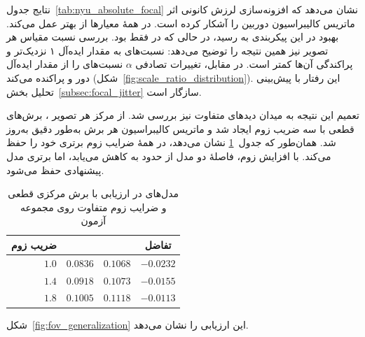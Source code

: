 نتایج جدول~\ref{tab:nyu_absolute_focal} نشان می‌دهد که افزونه‌سازی لرزش کانونی اثر ماتریس کالیبراسیون دوربین را آشکار کرده است. \proposedmodel{} در همهٔ معیارها از \controlmodel{} بهتر عمل می‌کند. بهبود  در این پیکربندی به  رسید، در حالی که در \zoomcropconfig{} فقط  بود. بررسی نسبت مقیاس هر تصویر نیز همین نتیجه را توضیح می‌دهد: نسبت‌های \proposedmodel{} به مقدار ایده‌آل ۱ نزدیک‌تر و پراکندگی آن‌ها کمتر است. در مقابل، تغییرات تصادفی $\alpha$ نسبت‌های \controlmodel{} را از مقدار ایده‌آل دور و پراکنده می‌کند (شکل~\ref{fig:scale_ratio_distribution}). این رفتار با پیش‌بینی تحلیل بخش~\ref{subsec:focal_jitter} سازگار است.

تعمیم این نتیجه به میدان دیدهای متفاوت نیز بررسی شد. از مرکز هر تصویر ، برش‌های قطعی با سه ضریب زوم ایجاد شد و ماتریس کالیبراسیون هر برش به‌طور دقیق به‌روز شد. همان‌طور که جدول~\ref{tab:fov_generalization} نشان می‌دهد، \proposedmodel{} در همهٔ ضرایب زوم برتری خود را حفظ می‌کند. با افزایش زوم، فاصلهٔ  دو مدل از حدود  به  کاهش می‌یابد، اما برتری مدل پیشنهادی حفظ می‌شود.

\begin{table}[htbp]
\centering
\caption{ مدل‌های \focaljitterconfig{} در ارزیابی با برش مرکزی قطعی و ضرایب زوم متفاوت روی مجموعه آزمون }
\label{tab:fov_generalization}
\begin{tabular}{rccc}
\hline
ضریب زوم & \tableproposedmodel{} & \tablecontrolmodel{} & تفاضل \\ \hline
$1.0$ & $\mathbf{0.0836}$ & $0.1068$ & $-0.0232$ \\
$1.4$ & $\mathbf{0.0918}$ & $0.1073$ & $-0.0155$ \\
$1.8$ & $\mathbf{0.1005}$ & $0.1118$ & $-0.0113$ \\ \hline
\end{tabular}
\end{table}

شکل~\ref{fig:fov_generalization} این ارزیابی را نشان می‌دهد.

